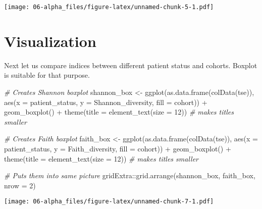 \documentclass[
  oneside]{book}
\newenvironment{Shaded}{\begin{snugshade}}{\end{snugshade}}
\newcommand{\AttributeTok}[1]{\textcolor[rgb]{0.77,0.63,0.00}{#1}}
\newcommand{\CommentTok}[1]{\textcolor[rgb]{0.56,0.35,0.01}{\textit{#1}}}
\newcommand{\DecValTok}[1]{\textcolor[rgb]{0.00,0.00,0.81}{#1}}
\newcommand{\FunctionTok}[1]{\textcolor[rgb]{0.00,0.00,0.00}{#1}}
\newcommand{\NormalTok}[1]{#1}
\newcommand{\OtherTok}[1]{\textcolor[rgb]{0.56,0.35,0.01}{#1}}
\newcommand{\SpecialCharTok}[1]{\textcolor[rgb]{0.00,0.00,0.00}{#1}}
\begin{document}
\texttt{[image: 06-alpha\_files/figure-latex/unnamed-chunk-5-1.pdf]}

\hypertarget{visualization-1}{%
\section{Visualization}\label{visualization-1}}

Next let us compare indices between different patient status and
cohorts. Boxplot is suitable for that purpose.

\begin{Shaded}
\begin{Highlighting}[]
\CommentTok{\# Creates Shannon boxplot }
\NormalTok{shannon\_box }\OtherTok{\textless{}{-}} \FunctionTok{ggplot}\NormalTok{(}\FunctionTok{as.data.frame}\NormalTok{(}\FunctionTok{colData}\NormalTok{(tse)),}
  \FunctionTok{aes}\NormalTok{(}\AttributeTok{x =}\NormalTok{ patient\_status, }
      \AttributeTok{y =}\NormalTok{ Shannon\_diversity,}
      \AttributeTok{fill =}\NormalTok{ cohort)) }\SpecialCharTok{+} 
  \FunctionTok{geom\_boxplot}\NormalTok{() }\SpecialCharTok{+}
  \FunctionTok{theme}\NormalTok{(}\AttributeTok{title =} \FunctionTok{element\_text}\NormalTok{(}\AttributeTok{size =} \DecValTok{12}\NormalTok{)) }\CommentTok{\# makes titles smaller}

\CommentTok{\# Creates Faith boxplot }
\NormalTok{faith\_box }\OtherTok{\textless{}{-}} \FunctionTok{ggplot}\NormalTok{(}\FunctionTok{as.data.frame}\NormalTok{(}\FunctionTok{colData}\NormalTok{(tse)), }\FunctionTok{aes}\NormalTok{(}\AttributeTok{x =}\NormalTok{ patient\_status, }
                                                     \AttributeTok{y =}\NormalTok{ Faith\_diversity, }
                                                     \AttributeTok{fill =}\NormalTok{ cohort)) }\SpecialCharTok{+} 
  \FunctionTok{geom\_boxplot}\NormalTok{() }\SpecialCharTok{+}
  \FunctionTok{theme}\NormalTok{(}\AttributeTok{title =} \FunctionTok{element\_text}\NormalTok{(}\AttributeTok{size =} \DecValTok{12}\NormalTok{)) }\CommentTok{\# makes titles smaller}

\CommentTok{\# Puts them into same picture}
\NormalTok{gridExtra}\SpecialCharTok{::}\FunctionTok{grid.arrange}\NormalTok{(shannon\_box, faith\_box, }\AttributeTok{nrow =} \DecValTok{2}\NormalTok{)}
\end{Highlighting}
\end{Shaded}

\texttt{[image: 06-alpha\_files/figure-latex/unnamed-chunk-7-1.pdf]}
\end{document}

